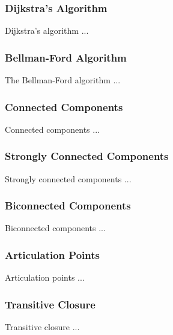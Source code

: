 \documentclass[10pt,onecolumn]{article}
\begin{document}
\subsubsection{Dijkstra's Algorithm}
Dijkstra's algorithm \cite{REF_} ...

\subsubsection{Bellman-Ford Algorithm}
The Bellman-Ford algorithm \cite{REF_} ...

\subsubsection{Connected Components}
Connected components \cite{REF_} ...

\subsubsection{Strongly Connected Components}
Strongly connected components \cite{REF_} ...

\subsubsection{Biconnected Components}
Biconnected components \cite{REF_} ...

\subsubsection{Articulation Points}
Articulation points \cite{REF_} ...

\subsubsection{Transitive Closure}
Transitive closure \cite{REF_} ...
\end{document}
